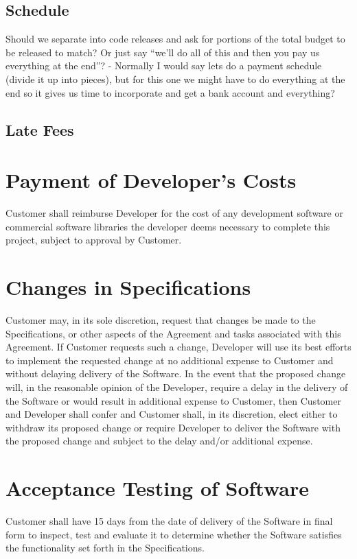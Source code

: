 \documentclass[11pt]{article}
\begin{document}
\subsection{Schedule}
Should we separate into code releases and ask for portions of the total budget to be released to match? Or just say “we’ll do all of this and then you pay us everything at the end”?
- Normally I would say lets do a payment schedule (divide it up into pieces), but for this one we might have to do everything at the end so it gives us time to incorporate and get a bank account and everything?
\subsection{Late Fees}
\section{Payment of Developer’s Costs}
Customer shall reimburse Developer for the cost of any development software or commercial software libraries the developer deems necessary to complete this project, subject to approval by Customer.
\section{Changes in Specifications}
Customer may, in its sole discretion, request that changes be made to the Specifications, or other aspects of the Agreement and tasks associated with this Agreement. If Customer requests such a change, Developer will use its best efforts to implement the requested change at no additional expense to Customer and without delaying delivery of the Software. In the event that the proposed change will, in the reasonable opinion of the Developer, require a delay in the delivery of the Software or would result in additional expense to Customer, then Customer and Developer shall confer and Customer shall, in its discretion, elect either to withdraw its proposed change or require Developer to deliver the Software with the proposed change and subject to the delay and/or additional expense.
\section{Acceptance Testing of Software}
Customer shall have 15 days from the date of delivery of the Software in final form to inspect, test and evaluate it to determine whether the Software satisfies the functionality set forth in the Specifications.
\end{document}
